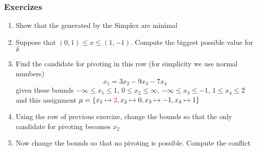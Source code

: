 \begin{frame}
  \frametitle{Exercizes}

  \begin{enumerate}

    \item Show that the \tconflicts generated by the Simplex are minimal

    \vfill
    \item Suppose that $(0,1) \leq x \leq (1,-1)$. Compute the biggest possible value for $\delta$

    \vfill
    \item Find the candidate for pivoting in this row (for simplicity we use normal numbers)
	  $$
	  x_1 = 3 x_2 - 9 x_3 - 7 x_4
	  $$
	  given these bounds $-\infty \leq x_1 \leq 1$, $0 \leq x_2 \leq \infty$, $- \infty \leq x_3 \leq -1$, $1 \leq x_4 \leq 2$
	  and this assignment $\mu = \{ x_1 \mapsto \textcolor{red}{2}, x_2 \mapsto 0, x_3 \mapsto -1, x_4 \mapsto 1 \}$
    \vfill

    \item Using the row of previous exercize, change the bounds
          so that the only candidate for pivoting becomes $x_2$

    \item Now change the bounds so that no pivoting is possible.
          Compute the conflict

  \end{enumerate}

\end{frame}
